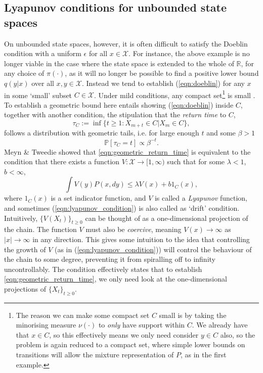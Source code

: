 \documentclass{article}
\newcommand{\ch}[1]{ \{#1_t\}_{t \geq 0} }
\newcommand{\X}{\mathcal{X}}
\begin{document}
\subsection{Lyapunov conditions for unbounded state spaces}
On unbounded state spaces, however, it is often difficult to satisfy the Doeblin condition with a uniform $\epsilon$ for all $x \in \X$.  For instance, the above example is no longer viable in the case where the state space is extended to the whole of $\mathbb{R}$, for any choice of $\pi(\cdot)$, as it will no longer be possible to find a positive lower bound $q(y|x)$ over all $x,y \in \X$.  Instead we tend to establish (\ref{eqn:doeblin}) for any $x$ in some `small' subset $C \in \X$.  Under mild conditions, any compact set\footnote{The reason we can make some compact set $C$ small is by taking the minorising measure $\nu(\cdot)$ to \emph{only} have support within $C$.  We already have that $x \in C$, so this effectively means we only need consider $y \in C$ also, so the problem is again reduced to a compact set, where simple lower bounds on transitions will allow the mixture representation of $P$, as in the first example.} is small \cite{roberts1996geometric}.  To establish a geometric bound here entails showing (\ref{eqn:doeblin}) inside $C$, together with another condition, the stipulation that the \emph{return time} to $C$,
\begin{equation} \label{eqn:return}
\tau_C := \inf \{ t \geq 1 : X_{m+t} \in C | X_m \in C \},
\end{equation}
follows a distribution with geometric tails, i.e. for large enough $t$ and some $\beta > 1$
\begin{equation}
\mathbb{P}[\tau_C = t] \propto \beta^{-t}. \label{eqn:geometric_return_time}
\end{equation}
Meyn \& Tweedie showed that \eqref{eqn:geometric_return_time} is equivalent to the condition that there exists a function $V: \X \to [1,\infty)$ such that for some $\lambda<1$, $b < \infty$,
\begin{equation}
\int V(y)P(x,dy) \leq \lambda V(x) + b1_C(x), \label{eqn:lyapunov_condition}
\end{equation}
where $1_C(x)$ is a  set indicator function, and $V$  is called a \emph{Lyapunov} function, and sometimes (\ref{eqn:lyapunov_condition}) is also called as `drift' condition.  Intuitively, $\{ V(X_t) \}_{t \geq 0}$ can be thought of as a one-dimensional projection of the chain.  The function $V$ must also be \emph{coercive}, meaning $V(x) \to \infty$ as $|x| \to \infty$ in any direction.  This gives some intuition to the idea that controlling the growth of $V$ (as in (\ref{eqn:lyapunov_condition})) will control the behaviour of the chain to some degree, preventing it from spiralling off to infinity uncontrollably.  The condition effectively states that to establish \eqref{eqn:geometric_return_time}, we only need look at the one-dimensional projections of $\ch{X}$.
\end{document}
